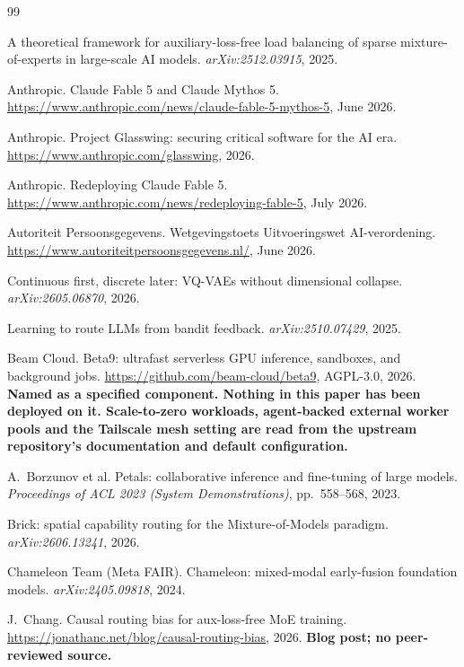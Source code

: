 \documentclass[11pt]{article}
\begin{document}
\begin{thebibliography}{99}\setlength{\itemsep}{1pt}

 A theoretical framework for auxiliary-loss-free load balancing of sparse mixture-of-experts in large-scale AI models. \emph{arXiv:2512.03915}, 2025.

 Anthropic. Claude Fable 5 and Claude Mythos 5. \url{https://www.anthropic.com/news/claude-fable-5-mythos-5}, June 2026.

 Anthropic. Project Glasswing: securing critical software for the AI era. \url{https://www.anthropic.com/glasswing}, 2026.

 Anthropic. Redeploying Claude Fable 5. \url{https://www.anthropic.com/news/redeploying-fable-5}, July 2026.

 Autoriteit Persoonsgegevens. Wetgevingstoets Uitvoeringswet AI-verordening. \url{https://www.autoriteitpersoonsgegevens.nl/}, June 2026.

 Continuous first, discrete later: VQ-VAEs without dimensional collapse. \emph{arXiv:2605.06870}, 2026.

 Learning to route LLMs from bandit feedback. \emph{arXiv:2510.07429}, 2025.

 Beam Cloud. Beta9: ultrafast serverless GPU inference, sandboxes, and background jobs. \url{https://github.com/beam-cloud/beta9}, AGPL-3.0, 2026. \textbf{Named as a specified component. Nothing in this paper has been deployed on it. Scale-to-zero workloads, agent-backed external worker pools and the Tailscale mesh setting are read from the upstream repository's documentation and default configuration.}

 A.~Borzunov et al. Petals: collaborative inference and fine-tuning of large models. \emph{Proceedings of ACL 2023 (System Demonstrations)}, pp.~558--568, 2023.

 Brick: spatial capability routing for the Mixture-of-Models paradigm. \emph{arXiv:2606.13241}, 2026.

 Chameleon Team (Meta FAIR). Chameleon: mixed-modal early-fusion foundation models. \emph{arXiv:2405.09818}, 2024.

 J.~Chang. Causal routing bias for aux-loss-free MoE training. \url{https://jonathanc.net/blog/causal-routing-bias}, 2026. \textbf{Blog post; no peer-reviewed source.}


\end{thebibliography}
\end{document}
